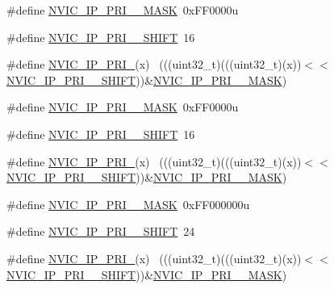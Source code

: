 \begin{DoxyCompactItemize}
\item 
\#define \hyperlink{group___n_v_i_c___register___masks_ga49a77ec05b40887c0ddc3ce4e47b72a8}{N\+V\+I\+C\+\_\+\+I\+P\+\_\+\+P\+R\+I\+\_\+\_\+\+M\+A\+SK}~0x\+F\+F0000u
\item 
\#define \hyperlink{group___n_v_i_c___register___masks_ga07ca207cbc1ff96a08afe00a45264736}{N\+V\+I\+C\+\_\+\+I\+P\+\_\+\+P\+R\+I\+\_\+\_\+\+S\+H\+I\+FT}~16
\item 
\#define \hyperlink{group___n_v_i_c___register___masks_ga006bdc94e3498aa49027847c18b26e91}{N\+V\+I\+C\+\_\+\+I\+P\+\_\+\+P\+R\+I\+\_}(x)                                            ~(((uint32\+\_\+t)(((uint32\+\_\+t)(x))$<$$<$\hyperlink{group___n_v_i_c___register___masks_ga07ca207cbc1ff96a08afe00a45264736}{N\+V\+I\+C\+\_\+\+I\+P\+\_\+\+P\+R\+I\+\_\+\_\+\+S\+H\+I\+FT}))\&\hyperlink{group___n_v_i_c___register___masks_ga49a77ec05b40887c0ddc3ce4e47b72a8}{N\+V\+I\+C\+\_\+\+I\+P\+\_\+\+P\+R\+I\+\_\+\_\+\+M\+A\+SK})
\item 
\#define \hyperlink{group___n_v_i_c___register___masks_ga9ad4afcd0277480b20a701370219cea6}{N\+V\+I\+C\+\_\+\+I\+P\+\_\+\+P\+R\+I\+\_\+\_\+\+M\+A\+SK}~0x\+F\+F0000u
\item 
\#define \hyperlink{group___n_v_i_c___register___masks_ga48e92ec7aa1b11d5fd492338b748eaa4}{N\+V\+I\+C\+\_\+\+I\+P\+\_\+\+P\+R\+I\+\_\+\_\+\+S\+H\+I\+FT}~16
\item 
\#define \hyperlink{group___n_v_i_c___register___masks_gacf59d852d9b72b1e05e778d1ad3c465a}{N\+V\+I\+C\+\_\+\+I\+P\+\_\+\+P\+R\+I\+\_}(x)                                            ~(((uint32\+\_\+t)(((uint32\+\_\+t)(x))$<$$<$\hyperlink{group___n_v_i_c___register___masks_ga48e92ec7aa1b11d5fd492338b748eaa4}{N\+V\+I\+C\+\_\+\+I\+P\+\_\+\+P\+R\+I\+\_\+\_\+\+S\+H\+I\+FT}))\&\hyperlink{group___n_v_i_c___register___masks_ga9ad4afcd0277480b20a701370219cea6}{N\+V\+I\+C\+\_\+\+I\+P\+\_\+\+P\+R\+I\+\_\+\_\+\+M\+A\+SK})
\item 
\#define \hyperlink{group___n_v_i_c___register___masks_ga49365dc3aff91af04da530f7f6bec195}{N\+V\+I\+C\+\_\+\+I\+P\+\_\+\+P\+R\+I\+\_\+\_\+\+M\+A\+SK}~0x\+F\+F000000u
\item 
\#define \hyperlink{group___n_v_i_c___register___masks_gaa85a48e57435dc20f2f4addac07495fb}{N\+V\+I\+C\+\_\+\+I\+P\+\_\+\+P\+R\+I\+\_\+\_\+\+S\+H\+I\+FT}~24
\item 
\#define \hyperlink{group___n_v_i_c___register___masks_gaa8920f48e08a2b7e44168d59a9b72add}{N\+V\+I\+C\+\_\+\+I\+P\+\_\+\+P\+R\+I\+\_}(x)                                            ~(((uint32\+\_\+t)(((uint32\+\_\+t)(x))$<$$<$\hyperlink{group___n_v_i_c___register___masks_gaa85a48e57435dc20f2f4addac07495fb}{N\+V\+I\+C\+\_\+\+I\+P\+\_\+\+P\+R\+I\+\_\+\_\+\+S\+H\+I\+FT}))\&\hyperlink{group___n_v_i_c___register___masks_ga49365dc3aff91af04da530f7f6bec195}{N\+V\+I\+C\+\_\+\+I\+P\+\_\+\+P\+R\+I\+\_\+\_\+\+M\+A\+SK})
$$
\end{DoxyCompactItemize}
